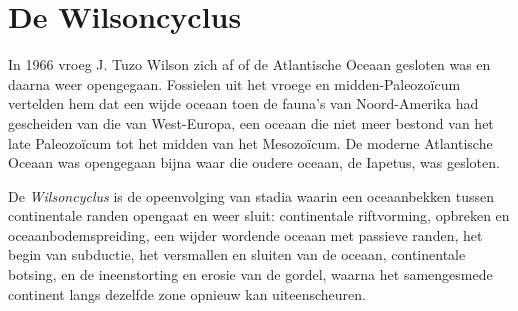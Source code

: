 \begin{omfigure}
\par{}
\end{omfigure}

\section{De Wilsoncyclus}\label{sec:b2:wilson-cycle:cycle}

In 1966 vroeg J. Tuzo Wilson zich af of de Atlantische Oceaan gesloten was en daarna
weer opengegaan. Fossielen uit het vroege en midden-Paleozoïcum vertelden hem dat een wijde oceaan toen
de fauna's van Noord-Amerika had gescheiden van die van West-Europa, een oceaan die niet meer
bestond van het late Paleozoïcum tot het midden van het Mesozoïcum. De moderne Atlantische Oceaan was opengegaan
bijna waar die oudere oceaan, de Iapetus, was gesloten.

\begin{definition}[Wilsoncyclus]\label{def:b2:wilson-cycle:wilson}
De \emph{Wilsoncyclus} is de opeenvolging van stadia waarin een
oceaanbekken tussen continentale randen opengaat en weer sluit: continentale riftvorming,
opbreken en oceaanbodemspreiding, een wijder wordende oceaan met passieve randen, het begin van
subductie, het versmallen en sluiten van de oceaan, continentale botsing, en de ineenstorting
en erosie van de gordel, waarna het samengesmede continent langs dezelfde zone opnieuw kan uiteenscheuren.
\end{definition}

